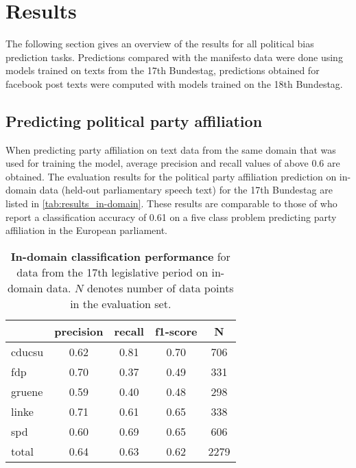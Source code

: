 \documentclass[11pt]{article}
\begin{document}
\section{Results}\label{sec:results}

The following section gives an overview of the results for all political bias prediction tasks. 
Predictions compared with the manifesto data were done using models trained on texts from the 17th Bundestag, predictions obtained for facebook post texts were computed with models trained on the 18th Bundestag. 

\subsection{Predicting political party affiliation}
When predicting party affiliation on text data from the same domain that was used for training the model, average precision and recall values of above 0.6 are obtained. The evaluation results for the political party affiliation prediction on in-domain data (held-out parliamentary speech text) for the 17th Bundestag are listed in \autoref{tab:results_in-domain}.
These results are comparable to those of \cite{Hirst2014} who report a classification accuracy of 0.61 on a five class problem predicting party affiliation in the European parliament.


\begin{table}[t]
\caption{
\label{tab:results_in-domain}
{\bf In-domain classification performance} for data from the 17th legislative period on in-domain data. $N$ denotes number of data points in the evaluation set.
}
\begin{center}
\begin{tabular}{lcccc}
    &         precision    &recall &  f1-score  & N  \\
\hline \hline
       cducsu   &    0.62  &    0.81  &    0.70  &     706\\
        fdp    &   0.70   &   0.37  &    0.49    &   331\\
     gruene &      0.59  &    0.40   &   0.48   &    298\\
      linke    &   0.71   &   0.61  &    0.65    &   338\\
        spd   &    0.60   &   0.69  &    0.65   &    606\\
\hline
 total &      0.64   &   0.63   &   0.62    &  2279 
%
\end{tabular}
\end{center}
\end{table}
\end{document}
